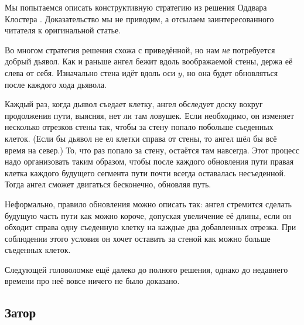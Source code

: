 \begin{addedbytheeditors}
Мы попытаемся описать конструктивную стратегию из решения Оддвара Клостера \cite{40}.
Доказательство мы не приводим, а отсылаем заинтересованного читателя к оригинальной статье.

Во многом стратегия решения схожа с приведённой, но нам \emph{не} потребуется добрый дьявол.
Как и раньше ангел бежит вдоль воображаемой стены, держа её слева от себя.
Изначально стена идёт вдоль оси $y$, но она будет обновляться после каждого хода дьявола.

Каждый раз, когда дьявол съедает клетку, ангел обследует доску вокруг продолжения пути, выясняя, нет ли там ловушек.
Если необходимо, он изменяет несколько отрезков стены так, чтобы за стену попало побольше съеденных клеток.
(Если бы дьявол не ел клетки справа от стены, то ангел шёл бы всё время на север.)
То, что раз попало за стену, остаётся там навсегда.
Этот процесс надо организовать таким образом, чтобы после каждого обновления пути правая клетка каждого будущего сегмента пути почти всегда оставалась несъеденной.
Тогда ангел сможет двигаться бесконечно, обновляя путь.

Неформально, правило обновления можно описать так:
ангел стремится сделать будущую часть пути как можно короче, допуская увеличение её длины, если он обходит справа одну съеденную клетку на каждые два добавленных отрезка.
При соблюдении этого условия он хочет оставить за стеной как можно больше съеденных клеток.
\pr
\end{addedbytheeditors}


\medskip

Следующей головоломке ещё далеко до полного решения,
однако до недавнего времени про неё вовсе ничего не было доказано.

\subsection*{Затор}

